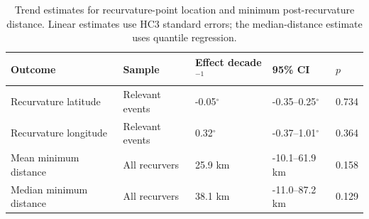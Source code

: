 \begin{table}[htbp]
\caption{Trend estimates for recurvature-point location and minimum post-recurvature distance. Linear estimates use HC3 standard errors; the median-distance estimate uses quantile regression.}
\label{tab:location_proximity}
\begin{tabular}{lllll}
\toprule
Outcome & Sample & Effect decade$^{-1}$ & 95\% CI & $p$ \\
\midrule
Recurvature latitude & Relevant events & -0.05$^\circ$ & -0.35--0.25$^\circ$ & 0.734 \\
Recurvature longitude & Relevant events & 0.32$^\circ$ & -0.37--1.01$^\circ$ & 0.364 \\
Mean minimum distance & All recurvers & 25.9 km & -10.1--61.9 km & 0.158 \\
Median minimum distance & All recurvers & 38.1 km & -11.0--87.2 km & 0.129 \\
\bottomrule
\end{tabular}
\end{table}
